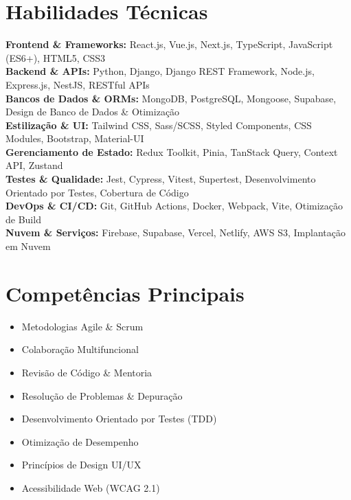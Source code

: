 \documentclass[10pt,a4paper]{article}
\begin{document}
\section*{Habilidades Técnicas}

\noindent
\textbf{\color{darkgray}Frontend \& Frameworks:} React.js, Vue.js, Next.js, TypeScript, JavaScript (ES6+), HTML5, CSS3 \\
\textbf{\color{darkgray}Backend \& APIs:} Python, Django, Django REST Framework, Node.js, Express.js, NestJS, RESTful APIs \\
\textbf{\color{darkgray}Bancos de Dados \& ORMs:} MongoDB, PostgreSQL, Mongoose, Supabase, Design de Banco de Dados \& Otimização \\
\textbf{\color{darkgray}Estilização \& UI:} Tailwind CSS, Sass/SCSS, Styled Components, CSS Modules, Bootstrap, Material-UI \\
\textbf{\color{darkgray}Gerenciamento de Estado:} Redux Toolkit, Pinia, TanStack Query, Context API, Zustand \\
\textbf{\color{darkgray}Testes \& Qualidade:} Jest, Cypress, Vitest, Supertest, Desenvolvimento Orientado por Testes, Cobertura de Código \\
\textbf{\color{darkgray}DevOps \& CI/CD:} Git, GitHub Actions, Docker, Webpack, Vite, Otimização de Build \\
\textbf{\color{darkgray}Nuvem \& Serviços:} Firebase, Supabase, Vercel, Netlify, AWS S3, Implantação em Nuvem

\section*{Competências Principais}

\noindent
\begin{minipage}[t]{0.48\textwidth}
  \begin{itemize}
    \item Metodologias Agile \& Scrum
    \item Colaboração Multifuncional
    \item Revisão de Código \& Mentoria
    \item Resolução de Problemas \& Depuração
  \end{itemize}
\end{minipage}%
\hfill
\begin{minipage}[t]{0.48\textwidth}
  \begin{itemize}
    \item Desenvolvimento Orientado por Testes (TDD)
    \item Otimização de Desempenho
    \item Princípios de Design UI/UX
    \item Acessibilidade Web (WCAG 2.1)
  \end{itemize}
\end{minipage}
\end{document}
